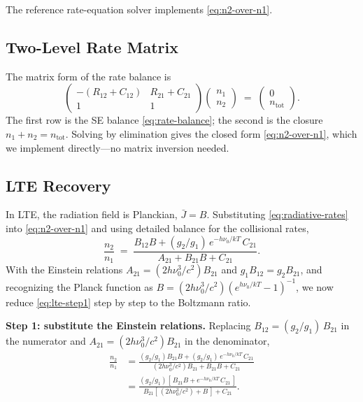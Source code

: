 \documentclass[11pt]{article}
\newcommand{\Jbar}{\bar{J}}
\begin{document}
The reference rate-equation solver implements \eqref{eq:n2-over-n1}.

\subsection{Two-Level Rate Matrix}

The matrix form of the rate balance is
\begin{equation}
\begin{pmatrix} -(R_{12} + C_{12}) & R_{21} + C_{21} \\
1 & 1
\end{pmatrix}\!
\begin{pmatrix} n_1 \\ n_2 \end{pmatrix}
\;=\;
\begin{pmatrix} 0 \\ n_{\mathrm{tot}} \end{pmatrix}.
\label{eq:rate-matrix}
\end{equation}
The first row is the SE balance \eqref{eq:rate-balance}; the second is
the closure $n_1 + n_2 = n_{\mathrm{tot}}$.  Solving by elimination
gives the closed form \eqref{eq:n2-over-n1}, which we implement
directly---no matrix inversion needed.

\subsection{LTE Recovery}
\label{sec:lte-recovery}

In LTE, the radiation field is Planckian, $\Jbar = B$. Substituting
\eqref{eq:radiative-rates} into \eqref{eq:n2-over-n1} and using
detailed balance for the collisional rates,
\begin{equation}
\frac{n_2}{n_1}
\;=\; \frac{B_{12} B + (g_2/g_1)\, e^{-h\nu_0/kT}\, C_{21}}
       {A_{21} + B_{21} B + C_{21}}.
\label{eq:lte-step1}
\end{equation}
With the Einstein relations $A_{21} = (2 h\nu_0^3/c^2) B_{21}$ and
$g_1 B_{12} = g_2 B_{21}$, and recognizing the Planck function as
$B = (2 h\nu_0^3/c^2) (e^{h\nu_0/kT} - 1)^{-1}$, we now reduce
\eqref{eq:lte-step1} step by step to the Boltzmann ratio.

\textbf{Step 1: substitute the Einstein relations.}
Replacing $B_{12} = (g_2/g_1)\, B_{21}$ in the numerator and
$A_{21} = (2 h\nu_0^3/c^2) B_{21}$ in the denominator,
\begin{align}
\frac{n_2}{n_1}
&= \frac{(g_2/g_1) B_{21} B + (g_2/g_1)\, e^{-h\nu_0/kT}\, C_{21}}
       {(2 h\nu_0^3/c^2) B_{21} + B_{21} B + C_{21}} \nonumber\\
&= \frac{(g_2/g_1)\!\left[\, B_{21} B + e^{-h\nu_0/kT}\, C_{21}\,\right]}
       {B_{21}\!\left[\,(2 h\nu_0^3/c^2) + B\,\right] + C_{21}} .
\label{eq:lte-step2}
\end{align}
\end{document}
